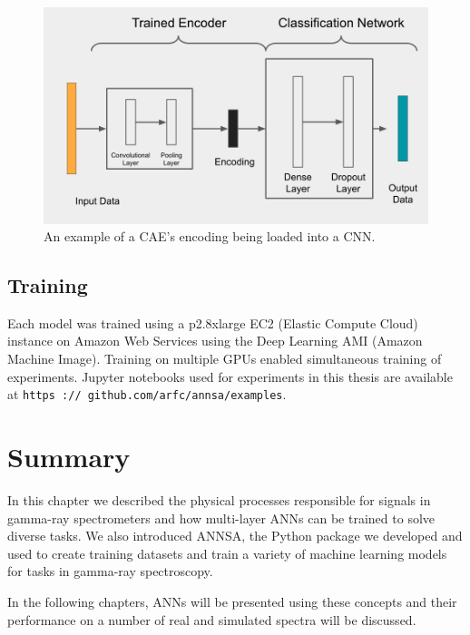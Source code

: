 \begin{figure}[H]
\centering
\includegraphics[trim=0 0 0 0,clip,width=0.9\linewidth]{images/annsa_caednn.png}
\caption{An example of a CAE's encoding being loaded into a CNN.}
\label{fig:annsa_caednn}
\end{figure}


\subsection{Training}

Each model was trained using a p2.8xlarge EC2 (Elastic Compute Cloud) instance on Amazon Web Services using the Deep Learning AMI (Amazon Machine Image). Training on multiple GPUs enabled simultaneous training of experiments. Jupyter notebooks used for experiments in this thesis are available at \verb|https :// github.com/arfc/annsa/examples|.


\section{Summary}

In this chapter we described the physical processes responsible for signals in gamma-ray spectrometers and how multi-layer ANNs can be trained to solve diverse tasks. We also introduced ANNSA, the Python package we developed and used to create training datasets and train a variety of machine learning models for tasks in gamma-ray spectroscopy. 

In the following chapters, ANNs will be presented using these concepts and their performance on a number of real and simulated spectra will be discussed. 
